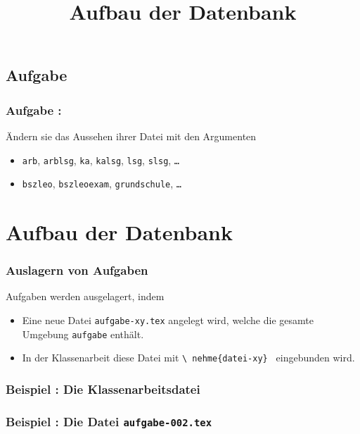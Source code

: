 \documentclass{beamer}
\newcounter{aufgabe}
\newcounter{beispiel}
\begin{document}
\subsection{Aufgabe \theaufgabe}

\begin{frame}
  \frametitle{Aufgabe \theaufgabe:}

  Ändern sie das Aussehen ihrer Datei mit den Argumenten 

  \begin{itemize}
    \item \texttt{arb}, \texttt{arblsg}, \texttt{ka}, \texttt{kalsg},
       \texttt{lsg}, \texttt{slsg}, \texttt{\dots}
    \item \texttt{bszleo}, \texttt{bszleoexam}, 
       \texttt{grundschule}, \texttt{\ldots} 
  \end{itemize}

\end{frame}


\section{Aufbau der Datenbank}


\title{Aufbau der Datenbank}
\author{}
\date{}
\frame{\titlepage}


\begin{frame}
  \frametitle{Auslagern von Aufgaben}

  Aufgaben werden ausgelagert, indem

  \begin{itemize}
  \item Eine neue Datei \texttt{aufgabe-xy.tex} angelegt wird, welche die gesamte
    Umgebung \texttt{aufgabe} enthält.
    \item In der Klassenarbeit diese Datei mit \texttt{\textbackslash 
       nehme\{datei-xy\} } eingebunden wird.
  \end{itemize}

\end{frame}



\begin{frame}[fragile]
  \frametitle{Beispiel \thebeispiel : Die Klassenarbeitsdatei}
  
\end{frame}

\begin{frame}[fragile]
  \frametitle{Beispiel \thebeispiel : Die Datei \texttt{aufgabe-002.tex}}
  
\end{frame}
\end{document}
